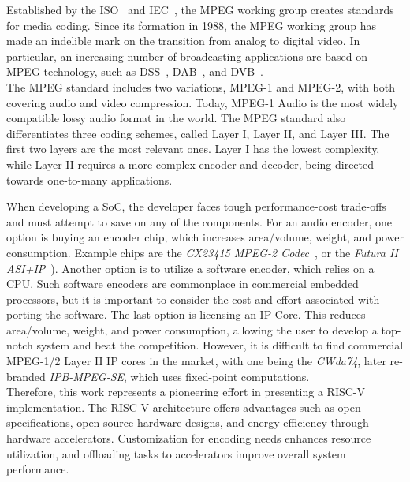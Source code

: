 
Established by the ISO~\cite{iso} and IEC~\cite{iec}, the MPEG working group creates standards for media coding. Since its formation in 1988, the MPEG working group has made an indelible mark on the transition from analog to digital video. In particular, an increasing number of broadcasting applications are based on MPEG technology, such as DSS~\cite{dss}, DAB~\cite{dab}, and DVB~\cite{dvb}.\\
The MPEG standard includes two variations, MPEG-1 and MPEG-2, with both covering audio and video compression. Today, MPEG-1 Audio is the most widely compatible lossy audio format in the world. The MPEG standard also differentiates three coding schemes, called Layer I, Layer II, and Layer III.  The first two layers are the most relevant ones. Layer I has the lowest complexity, while Layer II requires a more complex encoder and decoder, being directed towards one-to-many applications.

When developing a SoC, the developer faces tough performance-cost trade-offs and must attempt to save on any of the components. For an audio encoder, one option is buying an encoder chip, which increases area/volume, weight, and power consumption. Example chips are the \textit{CX23415 MPEG-2 Codec}~\cite{cx23415}, or the \textit{Futura II ASI+IP}~\cite{futura}). Another option is to utilize a software encoder, which relies on a CPU. Such software encoders are commonplace in commercial embedded processors, but it is important to consider the cost and effort associated with porting the software. The last option is licensing an IP Core. This reduces area/volume, weight, and power consumption, allowing the user to develop a top-notch system and beat the competition. However, it is difficult to find commercial MPEG-1/2 Layer II IP cores in the market, with one being the \textit{CWda74}, later re-branded \textit{IPB-MPEG-SE}, which uses fixed-point computations.\\
Therefore, this work represents a pioneering effort in presenting a RISC-V implementation.
The RISC-V architecture offers advantages such as open specifications, open-source hardware designs, and energy efficiency through hardware accelerators. Customization for encoding needs enhances resource utilization, and offloading tasks to accelerators improve overall system performance.

